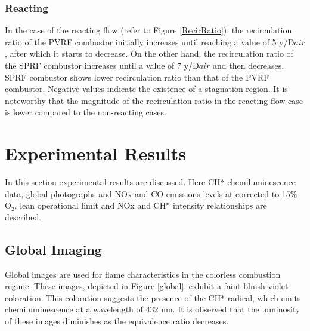 \subsubsection{Reacting}
In the case of the reacting flow (refer to Figure \ref{RecirRatio}), the recirculation ratio of the PVRF combustor initially increases until reaching a value of 5 y/D${air}$, after which it starts to decrease. On the other hand, the recirculation ratio of the SPRF combustor increases until a value of 7 y/D${air}$ and then decreases. SPRF combustor shows lower recirculation ratio than that of the PVRF combustor. Negative values indicate the existence of a stagnation region. It is noteworthy that the magnitude of the recirculation ratio in the reacting flow case is lower compared to the non-reacting cases. 

\section{Experimental Results}
In this section experimental results are discussed. Here CH* chemiluminescence data, global photographs and NOx and CO emissions levels at corrected to 15$\%$ O$_2$, lean operational limit and NOx and CH* intensity relationships are described.

\subsection{Global Imaging}
Global images are used for flame characteristics in the colorless combustion regime. These images, depicted in Figure \ref{global}, exhibit a faint bluish-violet coloration. This coloration suggests the presence of the CH* radical, which emits chemiluminescence at a wavelength of 432 nm. It is observed that the luminosity of these images diminishes as the equivalence ratio decreases.


